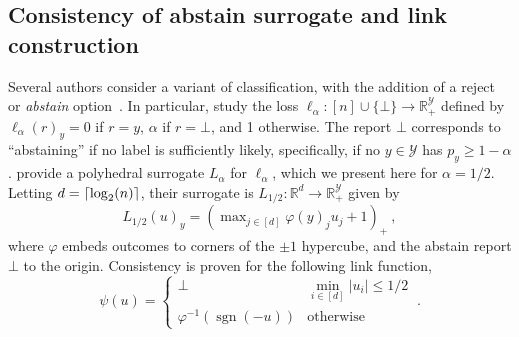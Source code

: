 \documentclass[11pt]{article}
\newcommand{\Comments}{1}
\newcommand{\mynote}[2]{\ifnum\Comments=1\textcolor{#1}{#2}\fi}
\newcommand{\mytodo}[2]{\ifnum\Comments=1%
  \todo[linecolor=#1!80!black,backgroundcolor=#1,bordercolor=#1!80!black]{#2}\fi}
\newcommand{\raf}[1]{\mynote{darkgreen}{[RF: #1]}}
\newcommand{\raft}[1]{\mytodo{green!20!white}{RF: #1}}
\newcommand{\jessie}[1]{\mynote{teal}{[JF: #1]}}
\newcommand{\reals}{\mathbb{R}}
\newcommand{\Y}{\mathcal{Y}}
\DeclarePairedDelimiter\ceil{\lceil}{\rceil}
\newcommand{\ellabs}[1]{\ell_{#1}}
\DeclareMathOperator*{\sgn}{sgn}
\begin{document}



\subsection{Consistency of abstain surrogate and link construction}
\label{sec:abstain}


Several authors consider a variant of classification, with the addition of a reject or \emph{abstain} option~\citep{bartlett2008classification,ramaswamy2018consistent,madras2018predict,elyaniv2010foundations,cortes2016learning}.
In particular, \citet{ramaswamy2018consistent} study the loss $\ellabs{\alpha} : [n] \cup \{\bot\} \to \reals^\Y_+$ defined by $\ellabs{\alpha}(r)_y = 0$ if $r=y$, $\alpha$ if $r = \bot$, and 1 otherwise.
The report $\bot$ corresponds to ``abstaining'' if no label is sufficiently likely, specifically, if no $y\in\Y$ has $p_y \geq 1-\alpha$.
\citeauthor{ramaswamy2018consistent} provide a polyhedral surrogate $L_\alpha$ for $\ellabs{\alpha}$, which we present here for $\alpha=1/2$.
Letting $d = \ceil{\log_2(n)}$, their surrogate is $L_{1/2} : \reals^d \to \reals^\Y_+$ given by
\begin{equation}\label{eq:abstain-surrogate}
L_{1/2}(u)_y = \left(\max\nolimits_{j \in [d]}\varphi(y)_j u_j + 1\right)_+~,
\end{equation}
where $\varphi$ embeds outcomes to corners of the $\pm 1$ hypercube, and the abstain report $\bot$ to the origin.
Consistency is proven for the following link function,
\begin{equation}\label{eq:abstain-link}
  \psi(u) = \begin{cases}
	\bot & \min_{i \in [d]} |u_i| \leq 1/2\\
	\varphi^{-1}(\sgn(-u)) &\text{otherwise}
  \end{cases}~.
\end{equation}
\end{document}

